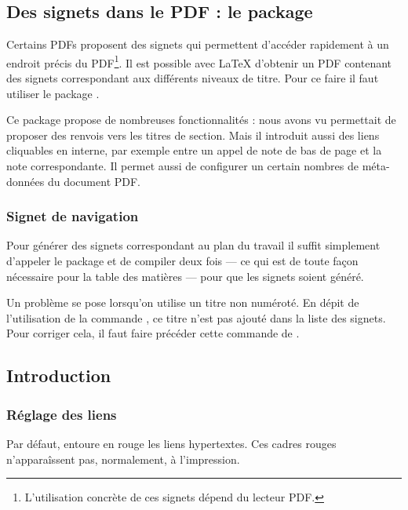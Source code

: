 \section{Des signets dans le PDF : le package }\label{hyperref}


Certains PDFs proposent des signets qui permettent d'accéder rapidement à un endroit précis du PDF\footnote{L'utilisation concrète de ces signets dépend du lecteur PDF.}. Il est possible avec \LaTeX{} d'obtenir un PDF contenant des signets correspondant aux différents niveaux de titre. Pour ce faire il faut utiliser le package .

Ce package propose de nombreuses fonctionnalités :  nous avons vu  permettait de proposer des renvois vers les titres de section.
Mais il introduit aussi des liens cliquables en interne, par exemple entre un appel de note de bas de page et la note correspondante. Il permet aussi de configurer un certain nombres de méta-données du document PDF.

\subsection{Signet de navigation}

Pour générer des signets correspondant au plan du travail il suffit simplement d'appeler le package et de compiler deux fois --- ce qui est de toute façon nécessaire pour la table des matières --- pour que les signets soient généré.

Un problème se pose lorsqu'on utilise un titre non numéroté. En dépit de l'utilisation de la commande , ce titre n'est pas ajouté dans la liste des signets. Pour corriger cela, il faut faire précéder cette commande de .

\begin{latexcode}
{}
\chapter*{Introduction}
\end{latexcode}

\subsection{Réglage des liens}
Par défaut,  entoure en rouge les liens hypertextes. Ces cadres rouges n'apparaîssent pas, normalement, à l'impression.

